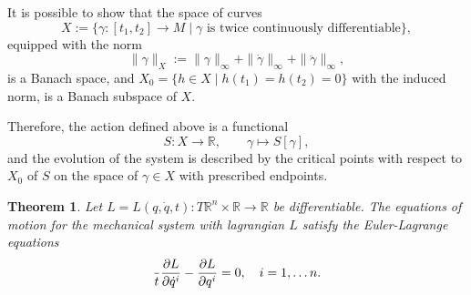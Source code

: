 \documentclass[english,fontsize=11pt,paper=a5,oneside]{scrbook}
\newcommand{\R}{\mathbb{R}}
\let\d\relax
\DeclareMathOperator{\d}{d}
\newtheorem{theorem}{Theorem}[chapter]
\theoremstyle{definition}
\begin{document}
It is possible to show that the space of curves 
\begin{equation}
    X := \big\{ \gamma: [t_1, t_2] \to M \mid \gamma \mbox{ is twice continuously differentiable}\big\},
\end{equation} equipped with the norm
\begin{equation}
    \|\gamma\|_X :=
    \|\gamma\|_\infty + \|\dot \gamma\|_\infty + \|\ddot \gamma\|_\infty,
\end{equation}
is a Banach space, and $X_0 = \big\{h\in X \mid h(t_1) = h(t_2) = 0\big\}$ with the induced norm, is a Banach subspace of $X$. 

Therefore, the action defined above is a functional
\begin{equation}
    S : X \to \R,\qquad \gamma \mapsto S[\gamma],
\end{equation}
and the evolution of the system is described by the critical points with respect to $X_0$ of $S$ on the space of $\gamma \in X$ with prescribed endpoints.

\begin{theorem}
    Let $L = L(q, \dot q, t) : T\R^{n}\times\R \to \R$ be differentiable.
    The equations of motion for the mechanical system with lagrangian $L$ satisfy the \emph{Euler-Lagrange equations}
    \begin{equation}\label{eq:eulerlagrange}
        \frac{\d}{\d t}\frac{\partial L}{\partial \dot q^i} - \frac{\partial L}{\partial q^i} = 0, \quad i=1,\ldots n.
    \end{equation}
\end{theorem}
\end{document}
